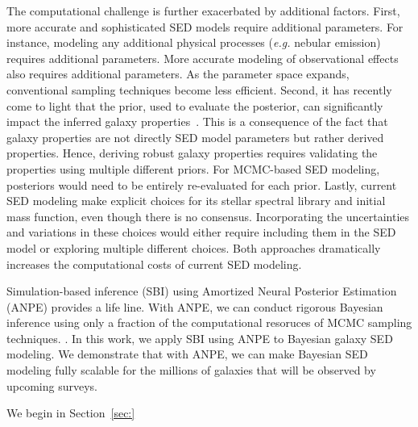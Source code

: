 The computational challenge is further exacerbated by additional factors. 
First, more accurate and sophisticated SED models require additional
parameters. 
For instance, modeling any additional physical processes (\emph{e.g.} nebular
emission) requires additional parameters. 
More accurate modeling of observational effects also requires additional
parameters. 
As the parameter space expands, conventional sampling techniques become less
efficient. 
Second, it has recently come to light that the prior, used to evaluate the
posterior, can significantly impact the inferred galaxy
properties~\citep{carnall2017, leja2017, hahn2022}. 
This is a consequence of the fact that galaxy properties are not directly SED
model parameters but rather derived properties.
Hence, deriving robust galaxy properties requires validating the properties
using multiple different priors. 
For MCMC-based SED modeling, posteriors would need to be entirely re-evaluated
for each prior.
Lastly, current SED modeling make explicit choices for its stellar spectral
library and initial mass function, even though there is no consensus. 
Incorporating the uncertainties and variations in these choices would either
require including them in the SED model or exploring multiple different choices.
Both approaches dramatically increases the computational costs of current SED
modeling.  

Simulation-based inference (SBI) using Amortized Neural Posterior Estimation
(ANPE) provides a life line. 
With ANPE, we can conduct rigorous Bayesian inference using only a fraction of
the computational resoruces of MCMC sampling techniques.
. 
In this work, we apply SBI using ANPE to Bayesian galaxy SED modeling. 
We demonstrate that with ANPE, we can make Bayesian SED modeling fully scalable
for the millions of galaxies that will be observed by upcoming surveys.

We begin in Section~\ref{sec:}



